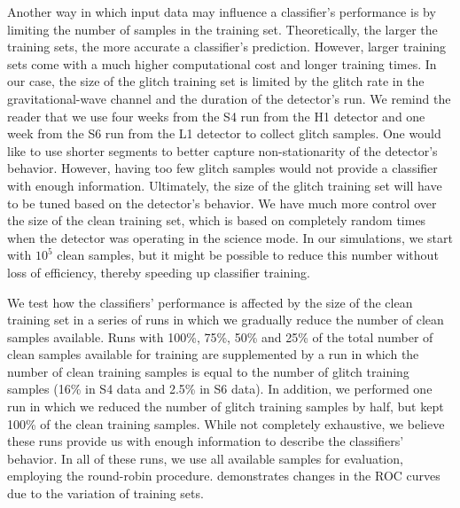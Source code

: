 \documentclass[prd, twocolumn, lengthcheck, superscriptaddress, showpacs, letterpaper, nofootinbib]{revtex4-1}
\begin{document}
Another way in which input data may influence a classifier's performance is by limiting the number of samples in the training set. Theoretically, the larger the training sets, the more accurate a classifier's prediction. However, larger training sets come with a much higher computational cost and longer training times. In our case, the size of the glitch training set is limited by the glitch rate in the gravitational-wave channel and the duration of the detector's run. We remind the reader that we use four weeks from the S4 run from the H1 detector and one week from the S6 run from the L1 detector to collect glitch samples. One would like to use shorter segments to better capture non-stationarity of the detector's behavior. However, having too few glitch samples would not provide a classifier  with enough information. Ultimately, the size of the glitch training set will have to be tuned based on the detector's behavior. We have much more control over the size of the clean training set, which is based on completely random times when the detector was operating in the science mode. In our simulations, we start with $10^5$ clean samples, but it might be possible to reduce this number without loss of efficiency, thereby speeding up classifier training. 

We test how the classifiers' performance is affected by the size of the clean training set in a series of runs in which we gradually reduce the number of clean samples available. Runs with 100\%, 75\%, 50\% and 25\% of the total number of clean samples available for training are supplemented by a run in which the number of clean training samples is equal to the number of glitch training samples (16\% in S4 data and 2.5\% in S6 data). In addition, we performed one run in which we reduced the number of glitch training samples by half, but kept 100\% of the clean training samples. While not completely exhaustive, we believe these runs provide us with enough information to describe the classifiers' behavior. In all of these runs, we use all available samples for evaluation, employing the round-robin procedure.  demonstrates changes in the \ac{ROC} curves due to the variation of training sets. 
\end{document}
